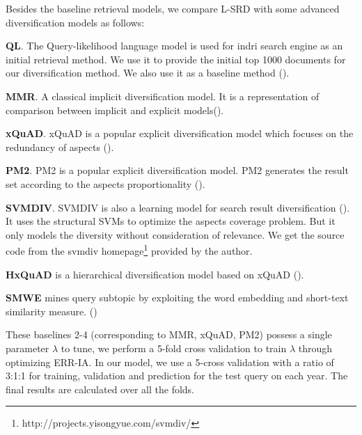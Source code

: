 \documentclass[review]{elsarticle}
\newcommand\revised[1]{{\color{black} #1}}
\begin{document}
Besides the baseline retrieval models, we compare L-SRD with some advanced diversification models as follows:
\begin{itemize}
    \item \textbf{QL}. The Query-likelihood language model is used for indri search engine as an initial retrieval method. We use it to provide the initial top 1000 documents for our diversification method. We also use it as a baseline method (\cite{dang2012diversity}).
    
	\item \textbf{MMR}. A classical implicit diversification model. It is a representation of comparison between implicit and explicit models(\cite{carbonell1998use}).
	
	\item \textbf{xQuAD}. xQuAD is a popular explicit diversification model which focuses on the redundancy of aspects (\cite{santos2010exploiting}).
	
	\item \textbf{PM2}. PM2 is a popular explicit diversification model. PM2 generates the result set according to the aspects proportionality (\cite{dang2012diversity}).
	
    \item \textbf{SVMDIV}. SVMDIV is also a learning model for search result diversification (\cite{yue2008predicting}). It uses the structural SVMs to optimize the aspects coverage problem. But it only models the diversity without consideration of relevance. We get the source code from the svmdiv homepage\footnote{http://projects.yisongyue.com/svmdiv/} provided by the author.
    
    \revised{
    	\item \textbf{HxQuAD} is a hierarchical diversification model based on xQuAD (\cite{Hu15searchresult}).
    	}
    
    \item \textbf{SMWE} mines query subtopic by exploiting the word embedding and short-text similarity measure. (\cite{Ullah2016QuerySM})
\end{itemize}


\revised{
These baselines 2-4 (corresponding to MMR, xQuAD, PM2) possess a single parameter $\lambda$ to tune, we perform a 5-fold cross validation to train $\lambda$ through optimizing ERR-IA. In our model, we use a 5-cross validation with a ratio of 3:1:1 for training, validation and prediction for the test query on each year. The final results are calculated over all the folds.}
\end{document}
